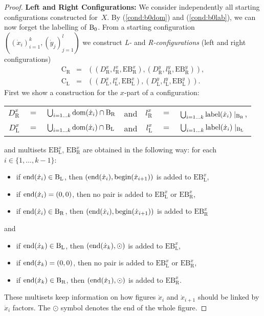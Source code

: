 \documentclass[final,nomarks]{dmtcs-episciences}
\newcommand{\dfbegin}[1]{\mbox{\rm begin}(#1)}
\newcommand{\dfend}[1]{\mbox{\rm end}(#1)}
\newcommand{\dflabel}[1]{\mbox{\rm label}(#1)}
\newcommand{\dfdomain}[1]{\mbox{\rm dom}(#1)}
\newcommand{\confBegends}[2]{\mathrm{EB}^{#1}_{\mathrm #2}}
\newcommand{\conf}[1]{\mathrm{C}_{\mathrm #1}}
\newcommand{\confDom}[2]{D^{#1}_{\mathrm #2}}
\newcommand{\confLab}[2]{l^{#1}_{\mathrm #2}}
\newcommand{\confEnd}{\odot}
\newcommand{\ddx}{\ddot{x}}
\newcommand{\dx}{\dot{x}}
\newcommand{\dy}{\dot{y}}
\begin{document}
\begin{proof}
\textbf{Left and Right Configurations:}
We consider independently all starting configurations constructed for~$X$.
By (\ref{cond:b0dom}) and (\ref{cond:b0lab}), we can now forget the
labelling of ${\mathrm B}_0$. From a starting configuration $((\dx_i)_{i=1}^k,(\dy_j)_{j=1}^l)$ 
we construct \emph{L-} and
\emph{R-configurations} (left and right configurations)
\begin{eqnarray*}
	\conf{R} & = & ((\confDom{x}{R},\confLab{x}{R},\confBegends{x}{R}),(\confDom{y}{R},\confLab{y}{R},\confBegends{y}{R})),\\
	\conf{L} & = &
	((\confDom{x}{L},\confLab{x}{L},\confBegends{x}{L}),(\confDom{y}{L},\confLab{y}{L},\confBegends{y}{L})).
\end{eqnarray*}
First we show a construction for the $x$-part of a configuration:
\begin{center}
\begin{tabular}{rclcrcl}
 $\confDom{x}{R}$ & $=$ & $\bigcup_{i=1\ldots k}\dfdomain{\dx_i}\cap\rblock$ & and & $\confLab{x}{R}$ & $=$ & $\bigcup_{i=1\ldots
 k}\dflabel{\dx_i}\mid_{\rblock}$,\\
 $\confDom{x}{L}$ & $=$ & $\bigcup_{i=1\ldots k}\dfdomain{\dx_i}\cap\lblock$ & and & $\confLab{x}{L}$ & $=$ & $\bigcup_{i=1\ldots
 k}\dflabel{\dx_i}\mid_{\lblock}$
\end{tabular}
\end{center}
and multisets $\confBegends{x}{L}$, $\confBegends{x}{R}$ are obtained in the following way: for each
$i\in\{1,\ldots,k-1\}$:
\begin{itemize}
 \item if $\dfend{\dx_i} \in \lblock$,
 then $(\dfend{\dx_i},\dfbegin{\dx_{i+1}})$ is added to $\confBegends{x}{L}$,
 \item if $\dfend{\dx_i} = (0,0)$,
 then no pair is added to $\confBegends{x}{L}$ or $\confBegends{x}{R}$,
 \item if $\dfend{\dx_i} \in \rblock$,
 then $(\dfend{\dx_i},\dfbegin{\dx_{i+1}})$ is added to $\confBegends{x}{R}$
\end{itemize}
and
\begin{itemize}
 \item if $\dfend{\dx_k} \in \lblock$,
 then $(\dfend{\dx_k},\confEnd)$ is added to $\confBegends{x}{L}$,
 \item if $\dfend{\dx_k} = (0,0)$,
 then no pair is added to $\confBegends{x}{L}$ or $\confBegends{x}{R}$,
 \item if $\dfend{\dx_k} \in \rblock$,
 then $(\dfend{\dx_1},\confEnd)$ is added to $\confBegends{x}{R}$.
\end{itemize}
These multisets keep information on how figures $\dx_i$ and $\dx_{i+1}$ 
should be linked by $\ddx_i$ factors. 
The $\confEnd$ symbol denotes the end of the whole figure.


\end{proof}
\end{document}
